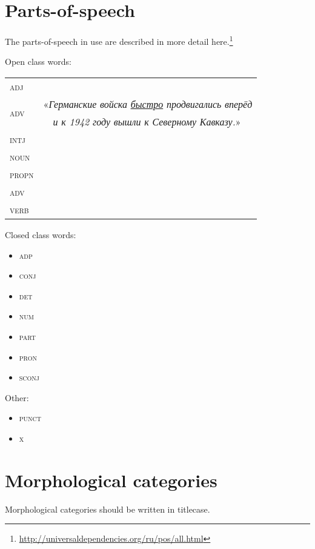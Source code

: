 \documentclass[a4paper,11pt, onecolumn,twoside]{article}
\newcommand{\gmk}[1]{{\rm {\ll \textsc{#1}}}}
\begin{document}
\section{Parts-of-speech}

The parts-of-speech in use are described in more detail here.\footnote{\url{http://universaldependencies.org/ru/pos/all.html}}

Open class words:

\begin{tabular}{ll}
   \gmk{adj} &    \\
   \multirow{2}{*}{\gmk{adv}} & «\emph{Германские войска \underline{быстро} продвигались вперёд} \\
                              & ~~\emph{и к 1942 году вышли к Северному Кавказу.}» \\
   \gmk{intj} &  \\
   \gmk{noun} &  \\
   \gmk{propn} &  \\
   \gmk{adv} &  \\
   \gmk{verb} &  \\
\end{tabular}

Closed class words:

\begin{itemize}
   \item \gmk{adp}
   \item \gmk{conj}
   \item \gmk{det}
   \item \gmk{num}
   \item \gmk{part}
   \item \gmk{pron}
   \item \gmk{sconj}
\end{itemize}

Other:

\begin{itemize}
   \item \gmk{punct}
   \item \gmk{x}
\end{itemize}

\section{Morphological categories}


Morphological categories should be written in titlecase.
\end{document}
